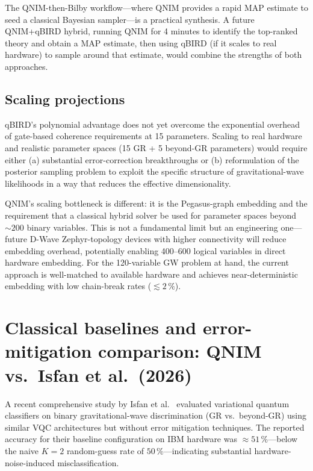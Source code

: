 \documentclass[11pt,a4paper, english]{book}
\theoremstyle{plain}
\theoremstyle{definition}
\numberwithin{equation}{chapter}
\numberwithin{figure}{chapter}
\numberwithin{table}{chapter}
\begin{document}
The QNIM-then-Bilby workflow---where QNIM provides a rapid MAP estimate to seed
a classical Bayesian sampler---is a practical synthesis. A future QNIM+qBIRD
hybrid, running QNIM for 4 minutes to identify the top-ranked theory and obtain
a MAP estimate, then using qBIRD (if it scales to real hardware) to sample
around that estimate, would combine the strengths of both approaches.

\subsection{Scaling projections}

qBIRD's polynomial advantage does not yet overcome the exponential overhead
of gate-based coherence requirements at 15 parameters. Scaling to real hardware
and realistic parameter spaces (15 GR + 5 beyond-GR parameters) would require
either (a) substantial error-correction breakthroughs or (b) reformulation of
the posterior sampling problem to exploit the specific structure of gravitational-wave
likelihoods in a way that reduces the effective dimensionality.

QNIM's scaling bottleneck is different: it is the Pegasus-graph embedding and
the requirement that a classical hybrid solver be used for parameter spaces
beyond $\sim\!200$ binary variables. This is not a fundamental limit but an
engineering one---future D-Wave Zephyr-topology devices with higher connectivity
will reduce embedding overhead, potentially enabling 400--600 logical variables
in direct hardware embedding. For the 120-variable GW problem at hand, the
current approach is well-matched to available hardware and achieves near-deterministic
embedding with low chain-break rates ($\lesssim 2\,\%$).

\section{Classical baselines and error-mitigation comparison:
         QNIM vs.\ Isfan et al.\ (2026)}
\label{app:isfan-comparison}

A recent comprehensive study by Isfan et al.~\cite{Isfan_2026} evaluated
variational quantum classifiers on binary gravitational-wave discrimination
(GR vs.\ beyond-GR) using similar VQC architectures but without error
mitigation techniques. The reported accuracy for their baseline configuration
on IBM hardware was $\approx 51\,\%$---below the naive $K=2$ random-guess rate
of $50\,\%$---indicating substantial hardware-noise-induced misclassification.
\end{document}
